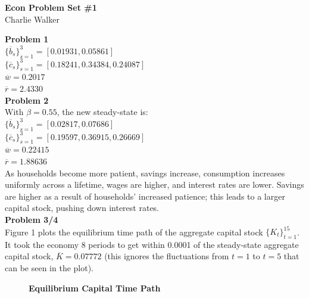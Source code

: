 \documentclass[letterpaper,12pt]{article}
\theoremstyle{definition}
\begin{document}
\begin{flushleft}
  \textbf{\large{Econ Problem Set \#1}} \\
  Charlie Walker
\end{flushleft}

\vspace{5mm}

\noindent\textbf{Problem 1}\\
$\{\overline{b}_s\}_{s=1}^3 = [0.01931, 0.05861]$\\
$\{\overline{c}_s\}_{s=1}^3 = [0.18241, 0.34384, 0.24087]$\\
$\overline{w} = 0.2017$\\
$\overline{r} = 2.4330$\\


\noindent\textbf{Problem 2}\\
With $\beta = 0.55$, the new steady-state is:\newline\\
$\{\overline{b}_s\}_{s=1}^3 = [0.02817, 0.07686]$\\
$\{\overline{c}_s\}_{s=1}^3 = [0.19597, 0.36915, 0.26669]$\\
$\overline{w} = 0.22415$\\
$\overline{r} = 1.88636$\newline\\
As households become more patient, savings increase, consumption increases uniformly across a lifetime, wages are higher, and interest rates are lower. Savings are higher as a result of households' increased patience; this leads to a larger capital stock, pushing down interest rates. \\

\noindent\textbf{Problem 3/4}\\
Figure 1 plots the equilibrium time path of the aggregate capital stock $\{K_t\}_{t=1}^{15}$. It took the economy 8 periods to get within 0.0001 of the steady-state aggregate capital stock, $\overline{K}=0.07772$ (this ignores the fluctuations from $t=1$ to $t=5$ that can be seen in the plot).
\begin{figure}[htb]\centering\captionsetup{width=4.0in}
  \caption{\textbf{Equilibrium Capital Time Path}}\label{FigExample}
\end{figure}
\end{document}
